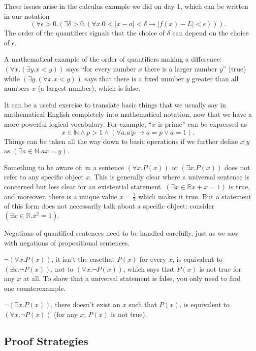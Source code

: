 \documentclass[12pt]{article}
\begin{document}
These issues arise in the calculus example we did on day 1, which can
be written in our notation $$(\forall \epsilon>0.(\exists \delta
>0.(\forall x.0<|x-a|<\delta \rightarrow |f(x)-L|<\epsilon))).$$ The
order of the quantifiers signals that the choice of $\delta$ can
depend on the choice of $\epsilon$.

A mathematical example of the order of quantifiers making a
difference: $(\forall x.(\exists y.x<y))$ says ``for every number $x$
there is a larger number $y$'' (true) while $(\exists y.(\forall
x.x<y))$ says that there is a fixed number $y$ greater than all
numbers $x$ (a largest number), which is false.

It can be a useful exercise to translate basic things that we usually say in mathematical English completely into mathematical notation, now that we have a more powerful logical vocabulary.  For example, ``$x$ is prime'' can be expressed
as $$x \in {\mathbb N} \wedge p>1 \wedge (\forall a.a|p \rightarrow a=p \vee a=1).$$  Things can be taken all the way down to basic operations if we further define $x|y$ as $(\exists a \in {\mathbb N}.ax=y)$.

Something to be aware of: in a sentence $(\forall x.P(x))$ or
$(\exists x.P(x))$ does not refer to any specific object $x$.  This is
generally clear where a universal sentence is concerned but less clear
for an existential statement.  $(\exists x\in {\mathbb R}x+x=1)$ is
true, and moreover, there is a unique value $x=\frac12$ which makes it
true.  But a statement of this form does not necessarily talk about a
specific object: consider $(\exists x\in{\mathbb R}.x^2=1).$

Negations of quantified sentences need to be handled carefully, just as we saw with negations of propositional
sentences.

$\neg(\forall x.P(x))$, it isn't the casethat $P(x)$ for every $x$, is equivalent to $(\exists x.\neg P(x))$, not
to $(\forall x. \neg P(x))$, which says that $P(x)$ is not true for any $x$ at all.  To show that a universal statement
is false, you only need to find one counterexample.

$\neg(\exists x.P(x))$, there doesn't exist an $x$ such that $P(x)$, is equivalent to $(\forall x.\neg P(x))$ (for any $x$, $P(x)$ is not true).

\subsection{Proof Strategies}
\end{document}
